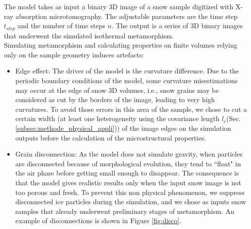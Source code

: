 \documentclass[draft,ms]{agujournal2019}
\begin{document}
The model takes as input a binary 3D image of a snow sample digitized with X-ray absorption microtomography. The adjustable parameters are the time step $t_{step}$ and the number of time steps $n$. The output is a series of 3D binary images that underwent the simulated isothermal metamorphism.\\
Simulating metamorphism and calculating properties on finite volumes relying only on the sample geometry induces artefacts:
\begin{itemize}[label=-]

\item Edge effect: The driver of the model is the curvature difference. Due to the periodic boundary conditions of the model, some curvature misestimations may occur at the edge of snow 3D volumes, i.e., snow grains may be considered as cut by the borders of the image, leading to very high curvatures. To avoid those errors  in this area of the sample, we chose to cut a certain width (at least one heterogeneity using the covariance length $l_c$(Sec. \ref{subsec:methode_physical_appli})) of the image edges on the simulation outputs before the calculation of the microstructural properties.\\
\vspace{0.2cm}

\item Grain disconnection: As the model does not simulate gravity, when particles are disconnected because of morphological evolution, they tend to ``float" in the air phase before getting small enough to disappear. The consequence is that the model gives realistic results only when the input snow image is not too porous and fresh. To prevent this non physical phenomenon, we suppress disconnected ice particles during the simulation, and we chose as inputs snow samples that already underwent preliminary stages of metamorphism. An example of disconnections is shown in Figure \ref{fig:disco}. 
\end{itemize}
\end{document}
